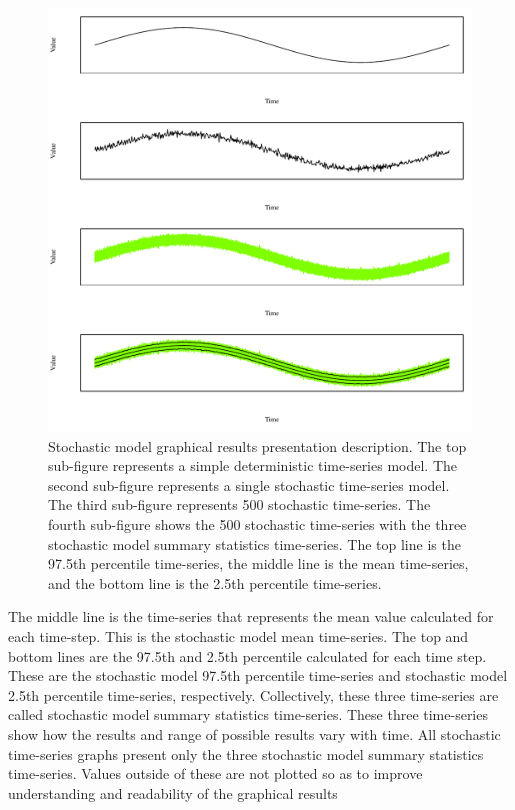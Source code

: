 \begin{figure}[htbp]
	\centering
	\includegraphics[width=0.9\linewidth]{"Figures/LineDiagram/TSDescription"}
	\caption[Stochastic model graphical results presentation description.]{Stochastic model graphical results presentation description.  The top sub-figure represents a simple deterministic time-series model.  The second sub-figure represents a single stochastic time-series model.  The third sub-figure represents 500 stochastic time-series.  The fourth sub-figure shows the 500 stochastic time-series with the three stochastic model summary statistics time-series.  The top line is the 97.5th percentile time-series, the middle line is the mean time-series, and the bottom line is the 2.5th percentile time-series.}
	\label{fig:StochExample}
\end{figure}

The middle line is the time-series that represents the mean value calculated for each time-step.  This is the stochastic model mean time-series.  The top and bottom lines are the 97.5th and 2.5th percentile calculated for each time step.  These are the stochastic model 97.5th percentile time-series and stochastic model 2.5th percentile time-series, respectively.  Collectively, these three time-series are called stochastic model summary statistics time-series.  These three time-series show how the results and range of possible results vary with time.  All stochastic time-series graphs present only the three stochastic model summary statistics time-series.  Values outside of these are not plotted so as to improve understanding and readability of the graphical results

